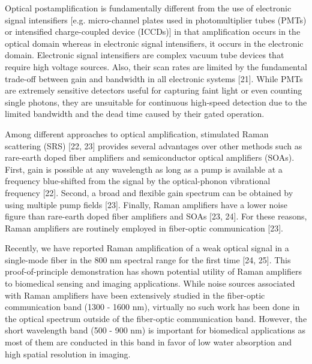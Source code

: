 Optical postamplification is fundamentally different from the use of electronic signal intensifiers [e.g. micro-channel plates used in photomultiplier tubes (PMTs) or intensified charge-coupled device (ICCDs)] in that amplification occurs in the optical domain whereas in electronic signal intensifiers, it occurs in the electronic domain. Electronic signal intensifiers are complex vacuum tube devices that require high voltage sources. Also, their scan rates are limited by the fundamental trade-off between gain and bandwidth in all electronic systems [21]. While PMTs are extremely sensitive detectors useful for capturing faint light or even counting single photons, they are unsuitable for continuous high-speed detection due to the limited bandwidth and the dead time caused by their gated operation.

Among different approaches to optical amplification, stimulated Raman scattering (SRS) [22, 23] provides several advantages over other methods such as rare-earth doped fiber amplifiers and semiconductor optical amplifiers (SOAs). First, gain is possible at any wavelength as long as a pump is available at a frequency blue-shifted from the signal by the optical-phonon vibrational frequency [22]. Second, a broad and flexible gain spectrum can be obtained by using multiple pump fields [23]. Finally, Raman amplifiers have a lower noise figure than rare-earth doped fiber amplifiers and SOAs [23, 24]. For these reasons, Raman amplifiers are routinely employed in fiber-optic communication [23].

Recently, we have reported Raman amplification of a weak optical signal in a single-mode fiber in the 800 nm spectral range for the first time [24, 25]. This proof-of-principle demonstration has shown potential utility of Raman amplifiers to biomedical sensing and imaging applications. While noise sources associated with Raman amplifiers have been extensively studied in the fiber-optic communication band (1300 - 1600 nm), virtually no such work has been done in the optical spectrum outside of the fiber-optic communication band. However, the short wavelength band (500 - 900 nm) is important for biomedical applications as most of them are conducted in this band in favor of low water absorption and high spatial resolution in imaging.

